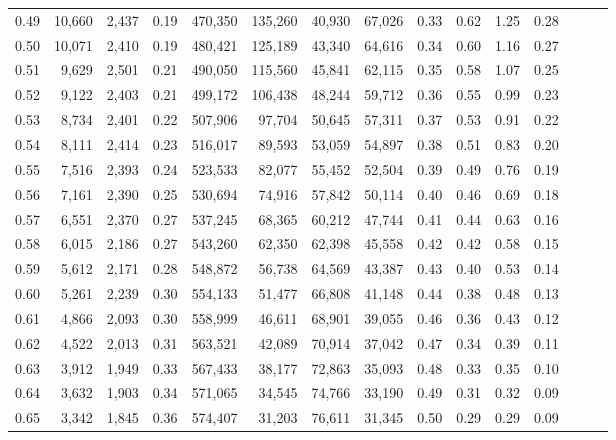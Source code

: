 \begin{tabular}{rrrrrrrrrrrrrrr}
0.49 &  10,660 &  2,437 &  0.19 &  470,350 &  135,260 &   40,930 &   67,026 &  0.33 &  0.62 &  1.25 &      0.28 \\
0.50 &  10,071 &  2,410 &  0.19 &  480,421 &  125,189 &   43,340 &   64,616 &  0.34 &  0.60 &  1.16 &      0.27 \\
0.51 &   9,629 &  2,501 &  0.21 &  490,050 &  115,560 &   45,841 &   62,115 &  0.35 &  0.58 &  1.07 &      0.25 \\
0.52 &   9,122 &  2,403 &  0.21 &  499,172 &  106,438 &   48,244 &   59,712 &  0.36 &  0.55 &  0.99 &      0.23 \\
0.53 &   8,734 &  2,401 &  0.22 &  507,906 &   97,704 &   50,645 &   57,311 &  0.37 &  0.53 &  0.91 &      0.22 \\
0.54 &   8,111 &  2,414 &  0.23 &  516,017 &   89,593 &   53,059 &   54,897 &  0.38 &  0.51 &  0.83 &      0.20 \\
0.55 &   7,516 &  2,393 &  0.24 &  523,533 &   82,077 &   55,452 &   52,504 &  0.39 &  0.49 &  0.76 &      0.19 \\
0.56 &   7,161 &  2,390 &  0.25 &  530,694 &   74,916 &   57,842 &   50,114 &  0.40 &  0.46 &  0.69 &      0.18 \\
0.57 &   6,551 &  2,370 &  0.27 &  537,245 &   68,365 &   60,212 &   47,744 &  0.41 &  0.44 &  0.63 &      0.16 \\
0.58 &   6,015 &  2,186 &  0.27 &  543,260 &   62,350 &   62,398 &   45,558 &  0.42 &  0.42 &  0.58 &      0.15 \\
0.59 &   5,612 &  2,171 &  0.28 &  548,872 &   56,738 &   64,569 &   43,387 &  0.43 &  0.40 &  0.53 &      0.14 \\
0.60 &   5,261 &  2,239 &  0.30 &  554,133 &   51,477 &   66,808 &   41,148 &  0.44 &  0.38 &  0.48 &      0.13 \\
0.61 &   4,866 &  2,093 &  0.30 &  558,999 &   46,611 &   68,901 &   39,055 &  0.46 &  0.36 &  0.43 &      0.12 \\
0.62 &   4,522 &  2,013 &  0.31 &  563,521 &   42,089 &   70,914 &   37,042 &  0.47 &  0.34 &  0.39 &      0.11 \\
0.63 &   3,912 &  1,949 &  0.33 &  567,433 &   38,177 &   72,863 &   35,093 &  0.48 &  0.33 &  0.35 &      0.10 \\
0.64 &   3,632 &  1,903 &  0.34 &  571,065 &   34,545 &   74,766 &   33,190 &  0.49 &  0.31 &  0.32 &      0.09 \\
0.65 &   3,342 &  1,845 &  0.36 &  574,407 &   31,203 &   76,611 &   31,345 &  0.50 &  0.29 &  0.29 &      0.09 \\

\end{tabular}
